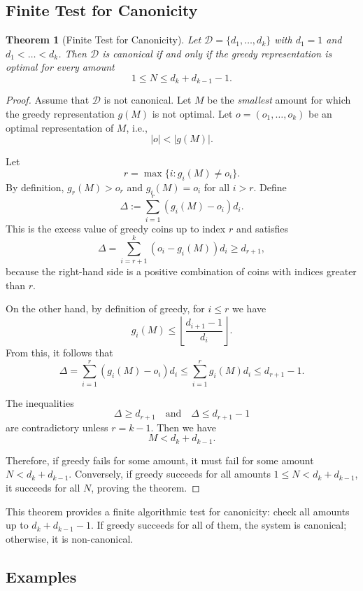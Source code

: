 \documentclass[12pt,a4paper]{report}
\newtheorem{theorem}{Theorem}
\begin{document}
\subsection{Finite Test for Canonicity}

\begin{theorem}[Finite Test for Canonicity]
Let $\mathcal{D} = \{d_1, \dots, d_k\}$ with $d_1 = 1$ and $d_1 < \dots < d_k$. 
Then $\mathcal{D}$ is canonical if and only if the greedy representation is optimal for every amount
\[
1 \le N \le d_k + d_{k-1} - 1.
\]
\end{theorem}

\begin{proof}
Assume that $\mathcal{D}$ is not canonical. Let $M$ be the \textit{smallest} amount for which the greedy representation $g(M)$ is not optimal. Let $o = (o_1, \dots, o_k)$ be an optimal representation of $M$, i.e.,
\[
|o| < |g(M)|.
\]

Let 
\[
r = \max\{ i : g_i(M) \neq o_i \}.
\]
By definition, $g_r(M) > o_r$ and $g_i(M) = o_i$ for all $i > r$. Define
\[
\Delta := \sum_{i=1}^{r} (g_i(M) - o_i)d_i.
\]
This is the excess value of greedy coins up to index $r$ and satisfies
\[
\Delta = \sum_{i=r+1}^{k} (o_i - g_i(M)) d_i \ge d_{r+1},
\]
because the right-hand side is a positive combination of coins with indices greater than $r$.

On the other hand, by definition of greedy, for $i \le r$ we have
\[
g_i(M) \le \left\lfloor \frac{d_{i+1}-1}{d_i} \right\rfloor.
\]
From this, it follows that
\[
\Delta = \sum_{i=1}^{r} (g_i(M) - o_i)d_i \le \sum_{i=1}^{r} g_i(M)d_i \le d_{r+1}-1.
\]

The inequalities
\[
\Delta \ge d_{r+1} \quad \text{and} \quad \Delta \le d_{r+1}-1
\]
are contradictory unless $r = k-1$. Then we have
\[
M < d_k + d_{k-1}.
\]

Therefore, if greedy fails for some amount, it must fail for some amount $N < d_k + d_{k-1}$. Conversely, if greedy succeeds for all amounts $1 \le N < d_k + d_{k-1}$, it succeeds for all $N$, proving the theorem.
\end{proof}

This theorem provides a finite algorithmic test for canonicity: check all amounts up to $d_k + d_{k-1} - 1$. If greedy succeeds for all of them, the system is canonical; otherwise, it is non-canonical.


\subsection*{Examples}
\end{document}
